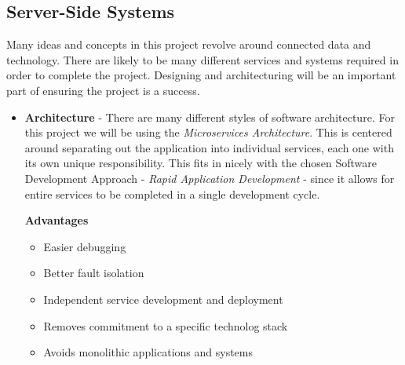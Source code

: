 \subsection{Server-Side Systems}

Many ideas and concepts in this project revolve around connected data and technology. There are likely to be many different services and systems required in order to complete the project. Designing and architecturing will be an important part of ensuring the project is a success.

\begin{itemize}
  \item \textbf{Architecture} - 
    There are many different styles of software architecture. For this project we will be using the \emph{Microservices Architecture}. This is centered around separating out the application into individual services, each one with its own unique responsibility. This fits in nicely with the chosen Software Development Approach - \emph{Rapid Application Development} - since it allows for entire services to be completed in a single development cycle.

    \textbf{Advantages}
    \begin{itemize}
      \item Easier debugging
      \item Better fault isolation
      \item Independent service development and deployment
      \item Removes commitment to a specific technolog stack
      \item Avoids monolithic applications and systems
    \end{itemize}


\end{itemize}
